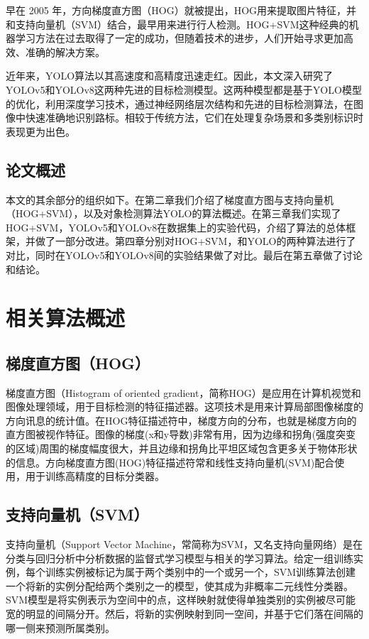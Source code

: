 \documentclass{article}
\begin{document}
早在 2005 年，方向梯度直方图（HOG）就被提出，HOG用来提取图片特征，并和支持向量机（SVM）结合，最早用来进行行人检测。HOG+SVM这种经典的机器学习方法在过去取得了一定的成功，但随着技术的进步，人们开始寻求更加高效、准确的解决方案。

近年来，YOLO算法以其高速度和高精度迅速走红。因此，本文深入研究了YOLOv5和YOLOv8这两种先进的目标检测模型。这两种模型都是基于YOLO模型的优化，利用深度学习技术，通过神经网络层次结构和先进的目标检测算法，在图像中快速准确地识别路标。相较于传统方法，它们在处理复杂场景和多类别标识时表现更为出色。

\subsection{论文概述}
本文的其余部分的组织如下。在第二章我们介绍了梯度直方图与支持向量机（HOG+SVM），以及对象检测算法YOLO的算法概述。在第三章我们实现了HOG+SVM，YOLOv5和YOLOv8在数据集上的实验代码，介绍了算法的总体框架，并做了一部分改进。第四章分别对HOG+SVM，和YOLO的两种算法进行了对比，同时在YOLOv5和YOLOv8间的实验结果做了对比。最后在第五章做了讨论和结论。

\section{相关算法概述}
\subsection{梯度直方图（HOG）}
梯度直方图（Histogram of oriented gradient，简称HOG）\cite{1467360}是应用在计算机视觉和图像处理领域，用于目标检测的特征描述器。这项技术是用来计算局部图像梯度的方向讯息的统计值。在HOG特征描述符中，梯度方向的分布，也就是梯度方向的直方图被视作特征。图像的梯度(x和y导数)非常有用，因为边缘和拐角(强度突变的区域)周围的梯度幅度很大，并且边缘和拐角比平坦区域包含更多关于物体形状的信息。方向梯度直方图(HOG)特征描述符常和线性支持向量机(SVM)配合使用，用于训练高精度的目标分类器。

\subsection{支持向量机（SVM）}
支持向量机（Support Vector Machine，常简称为SVM，又名支持向量网络）\cite{708428}是在分类与回归分析中分析数据的监督式学习模型与相关的学习算法。给定一组训练实例，每个训练实例被标记为属于两个类别中的一个或另一个，SVM训练算法创建一个将新的实例分配给两个类别之一的模型，使其成为非概率二元线性分类器。SVM模型是将实例表示为空间中的点，这样映射就使得单独类别的实例被尽可能宽的明显的间隔分开。然后，将新的实例映射到同一空间，并基于它们落在间隔的哪一侧来预测所属类别。
\end{document}
